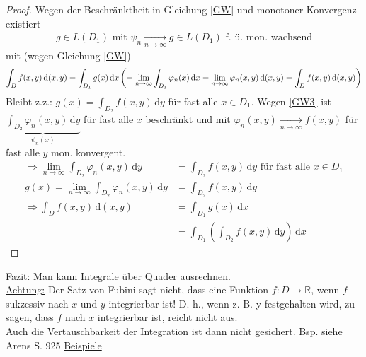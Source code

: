 \begin{proof}
    Wegen der Beschränktheit in Gleichung \eqref{GW} und monotoner Konvergenz existiert
    \begin{align}\label{GW3}
        g\in L(D_1) \text{ mit } \psi_n \xrightarrow[n\to\infty]{} g\in L(D_1) \text{ f. ü. mon. wachsend}
    \end{align}
    mit (wegen Gleichung \eqref{GW})
    \[
        \int_D f(x,y) \, \text{d}(x,y) = \int_{D_1} g(x) \, \text{d}x\\
        \left(=\lim_{n \to \infty} \int_{D_1} \varphi_n (x) \, \text{d}x = \lim_{n\to\infty} \varphi_n (x,y) \, \text{d}(x,y) = \int_D f(x,y) \, \text{d}(x,y)\right)
    \]
    Bleibt z.z.: $g(x) = \int_{D_2} f(x,y) \, \text{d}y$ für fast alle $x\in D_1$. Wegen \eqref{GW3} ist $\underbrace{\int_{D_2} \varphi_n (x,y) \, \text{d}y}_{\psi_n (x)}$ für fast alle $x$ beschränkt und mit $\varphi_n (x,y) \xrightarrow[n\to\infty]{} f(x,y)$ für fast alle $y$ mon. konvergent.
    \begin{align*}
        \Rightarrow \lim_{n\to\infty} \int_{D_2} \varphi_n (x,y) \, \text{d}y &= \int_{D_2} f(x,y) \, \text{d}y \text{ für fast alle } x \in D_1\\
        g(x) = \lim_{n\to\infty} \int_{D_2} \varphi_n (x,y) \, \text{d}y &= \int_{D_2} f(x,y) \, \text{d}y\\
        \Rightarrow \int_D f(x,y) \, \text{d}(x,y) &= \int_{D_1} g(x) \, \text{d}x\\
        &= \int_{D_1} \left(\int_{D_2} f(x,y) \, \text{d}y\right) \, \text{d}x
    \end{align*}
\end{proof}
\underline{Fazit:} Man kann Integrale über Quader ausrechnen.\\
\underline{Achtung:} Der Satz von Fubini sagt nicht, dass eine Funktion $f \colon D \to \mathbb{R}$, wenn $f$ sukzessiv nach $x$ und $y$ integrierbar ist! D. h., wenn z. B. y festgehalten wird, zu sagen, dass $f$ nach $x$ integrierbar ist, reicht nicht aus.\\
Auch die Vertauschbarkeit der Integration ist dann nicht gesichert. Bsp. siehe Arens S. 925
\underline{Beispiele}
